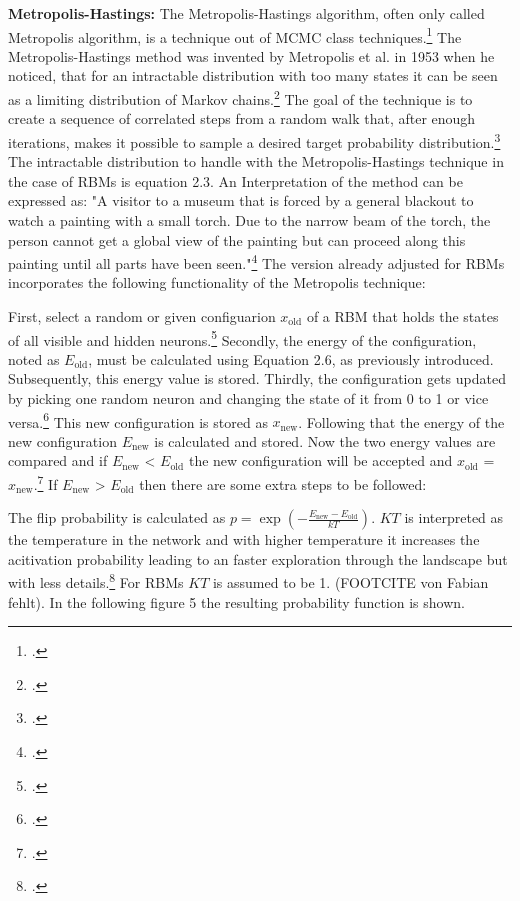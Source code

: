 \textbf{Metropolis-Hastings:} The Metropolis-Hastings algorithm, often only called Metropolis algorithm, is a technique out of \ac{MCMC} class techniques.\footcite[cf.][1]{patronOptimalRelaxationRate2024}
The Metropolis-Hastings method was invented by Metropolis et al. in 1953 when he noticed, that for an intractable distribution with too many states it can be seen as a limiting distribution of Markov chains.\footcite[cf.][1087-1092]{metropolisEquationStateCalculations1953}
The goal of the technique is to create a sequence of correlated steps from a random walk that, after enough iterations, makes it possible to sample a desired target probability distribution.\footcite[cf.][1]{patronOptimalRelaxationRate2024} 
The intractable distribution to handle with the Metropolis-Hastings technique in the case of \ac{RBM}s is equation 2.3.
An Interpretation of the method can be expressed as: "A visitor to a museum that is forced by a general blackout to watch
a painting with a small torch.
Due to the narrow beam of the torch, the person cannot get a global view of the painting but can proceed along this painting until all parts have been seen."\footcite[cf.][2]{robertMetropolisHastingsAlgorithm2016}
The version already adjusted for \ac{RBM}s incorporates the following functionality of the Metropolis technique:

First, select a random or given configuarion $x_{\text{old}}$ of a \ac{RBM} that holds the states of all visible and hidden neurons.\footcite[cf.][65]{beichlMetropolisAlgorithm2000}
Secondly, the energy of the configuration, noted as  $E_{\text{old}}$, must be calculated using Equation 2.6, as previously introduced. Subsequently, this energy value is stored.
Thirdly, the configuration gets updated by picking one random neuron and changing the state of it from 0 to 1 or vice versa.\footcite[cf.][1]{rosenthalOptimalProposalDistributions2009}
This new configuration is stored as $x_{\text{new}}$. Following that the energy of the new configuration $E_{\text{new}}$ is calculated and stored.
Now the two energy values are compared and if $E_{\text{new}}$ < $E_{\text{old}}$ the new configuration will be accepted and $x_{\text{old}}$ = $x_{\text{new}}$.\footcite[cf.][1-2]{patronOptimalRelaxationRate2024}
If $E_{\text{new}}$ > $E_{\text{old}}$ then there are some extra steps to be followed: 

The flip probability is calculated as $p=\exp\left(-\frac{E_{\text{new}}-E_{\text{old}}}{kT}\right)$.
\( KT \) is interpreted as the temperature in the network and with higher temperature it increases
the acitivation probability leading to an faster exploration through the landscape but with less details.\footcite[cf.][1-9]{liTemperatureBasedRestricted2016}
For \ac{RBM}s \( KT \) is assumed to be 1. (FOOTCITE von Fabian fehlt). In the following figure 5 the resulting probability function is shown.

